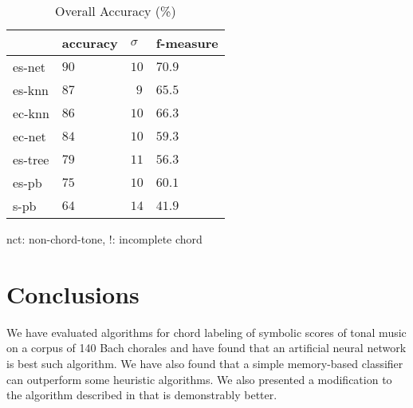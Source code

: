 \documentclass{article}
\begin{document}
\begin{table}
  \centering
  \begin{tabular}{l|p{1.5cm}p{.5cm}p{1.5cm}}
       & accuracy    & $\sigma$  & f-measure\\
\hline
es-net &$   90  $&$ 10$      &$70.9$ \\
es-knn &$   87  $&$~~9$      &$65.5$ \\
ec-knn &$   86  $&$ 10$      &$66.3$ \\
ec-net &$   84  $&$ 10$      &$59.3$ \\
es-tree&$   79  $&$ 11$      &$56.3$ \\
es-pb  &$   75  $&$ 10$      &$60.1$ \\
s-pb   &$   64  $&$ 14$      &$41.9$ \\

  \end{tabular}                                                        

\medskip

nct: non-chord-tone, !: incomplete chord
  \caption{Overall Accuracy (\%)}
  \label{tab:accuracy}
\end{table}

\section{Conclusions}
\label{sec:conclusions}

We have evaluated algorithms for chord labeling of symbolic scores of
tonal music on a corpus of 140 Bach chorales and have found that an
artificial neural network is best such algorithm. We have also found
that a simple memory-based classifier can outperform some heuristic
algorithms. We also presented a modification to the algorithm
described in \cite{pardo.ea:automated} that is demonstrably better.



\end{document}
